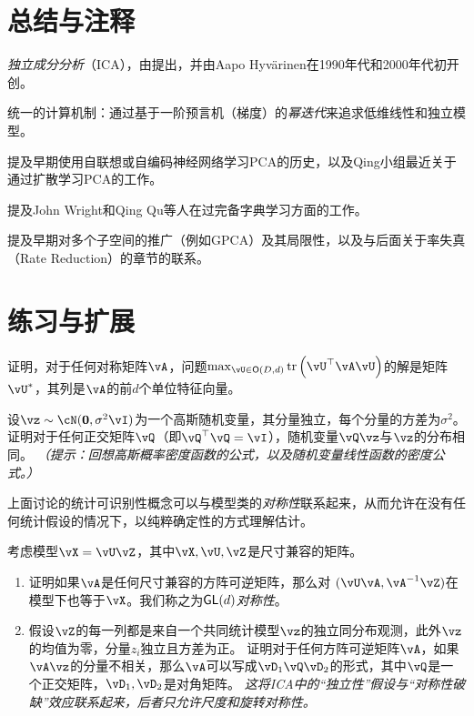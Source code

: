 \documentclass[../../book-main.tex]{subfiles}
\begin{document}
\section{总结与注释}



\textit{独立成分分析}（ICA），由\cite{Ans-1985}提出，并由Aapo Hyv\"{a}rinen在1990年代和2000年代初开创。

统一的计算机制：通过基于一阶预言机（梯度）的\textit{幂迭代}来追求低维线性和独立模型。

提及早期使用自联想或自编码神经网络学习PCA的历史，以及Qing小组最近关于通过扩散学习PCA的工作。

提及John Wright和Qing Qu等人在过完备字典学习方面的工作。

提及早期对多个子空间的推广（例如GPCA）及其局限性，以及与后面关于率失真（Rate Reduction）的章节的联系。


\section{练习与扩展}


\begin{exercise}\label{exercise:principal-components-derivation}
    证明，对于任何对称矩阵\(\vA\)，问题\(\max_{\vU \in \O(D, d)}\tr\left(\vU^{\top}\vA\vU\right)\)的解是矩阵\(\vU^{\ast}\)，其列是\(\vA\)的前\(d\)个单位特征向量。
\end{exercise}

\begin{exercise}\label{exercise:gaussian-rot-invar}
    设$\vz \sim \cN(\Zero, \sigma^2 \vI)$为一个高斯随机变量，其分量独立，每个分量的方差为$\sigma^2$。
    证明对于任何正交矩阵$\vQ$（即$\vQ^\top \vQ = \vI$），随机变量$\vQ \vz$与$\vz$的分布相同。
    \textit{（提示：回想高斯概率密度函数的公式，以及随机变量线性函数的密度公式。）}
\end{exercise}

\begin{exercise}\label{exercise:symmetry-identifiability}
    上面讨论的统计可识别性概念可以与模型类的\textit{对称性}联系起来，从而允许在没有任何统计假设的情况下，以纯粹确定性的方式理解估计。

    考虑模型$\vX = \vU \vZ$，其中$\vX, \vU, \vZ$是尺寸兼容的矩阵。
    \begin{enumerate}
        \item 证明如果$\vA$是任何尺寸兼容的方阵可逆矩阵，那么对
        $(\vU \vA, \vA^{-1} \vZ)$在模型下也等于$\vX$。我们称之为\textit{$\mathsf{GL}(d)$对称性}。
        \item 假设$\vZ$的每一列都是来自一个共同统计模型$\vz$的独立同分布观测，此外$\vz$的均值为零，分量$z_i$独立且方差为正。
        证明对于任何方阵可逆矩阵$\vA$，如果$\vA \vz$的分量不相关，那么$\vA$可以写成$\vD_1 \vQ \vD_2$的形式，其中$\vQ$是一个正交矩阵，$\vD_1, \vD_2$是对角矩阵。
        \textit{这将ICA中的“独立性”假设与“对称性破缺”效应联系起来，后者只允许尺度和旋转对称性。}
    \end{enumerate}

\end{exercise}
\end{document}
